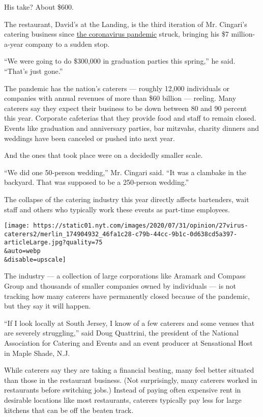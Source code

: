 His take? About \$600.

The restaurant, David's at the Landing, is the third iteration of Mr.
Cingari's catering business since
\href{https://www.nytimes.com/news-event/coronavirus}{the coronavirus
pandemic} struck, bringing his \$7 million-a-year company to a sudden
stop.

``We were going to do \$300,000 in graduation parties this spring,'' he
said. ``That's just gone.''

The pandemic has the nation's caterers --- roughly 12,000 individuals or
companies with annual revenues of more than \$60 billion --- reeling.
Many caterers say they expect their business to be down between 80 and
90 percent this year. Corporate cafeterias that they provide food and
staff to remain closed. Events like graduation and anniversary parties,
bar mitzvahs, charity dinners and weddings have been canceled or pushed
into next year.

And the ones that took place were on a decidedly smaller scale.

``We did one 50-person wedding,'' Mr. Cingari said. ``It was a clambake
in the backyard. That was supposed to be a 250-person wedding.''

The collapse of the catering industry this year directly affects
bartenders, wait staff and others who typically work these events as
part-time employees.

\texttt{[image: https://static01.nyt.com/images/2020/07/31/opinion/27virus-caterers2/merlin\_174904932\_46fa1c28-c79b-44cc-9b1c-0d638cd5a397-articleLarge.jpg?quality=75\\\&auto=webp\\\&disable=upscale]}

The industry --- a collection of large corporations like Aramark and
Compass Group and thousands of smaller companies owned by individuals
--- is not tracking how many caterers have permanently closed because of
the pandemic, but they say it will happen.

``If I look locally at South Jersey, I know of a few caterers and some
venues that are severely struggling,'' said Doug Quattrini, the
president of the National Association for Catering and Events and an
event producer at Sensational Host in Maple Shade, N.J.

While caterers say they are taking a financial beating, many feel better
situated than those in the restaurant business. (Not surprisingly, many
caterers worked in restaurants before switching jobs.) Instead of paying
often expensive rent in desirable locations like most restaurants,
caterers typically pay less for large kitchens that can be off the
beaten track.


